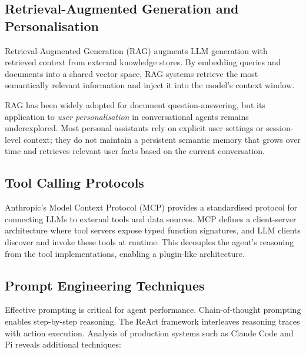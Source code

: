 \subsection{Retrieval-Augmented Generation and Personalisation}

Retrieval-Augmented Generation (RAG) \cite{lewis2020rag} augments LLM generation with retrieved context from external knowledge stores. By embedding queries and documents into a shared vector space, RAG systems retrieve the most semantically relevant information and inject it into the model's context window.

RAG has been widely adopted for document question-answering, but its application to \textit{user personalisation} in conversational agents remains underexplored. Most personal assistants rely on explicit user settings or session-level context; they do not maintain a persistent semantic memory that grows over time and retrieves relevant user facts based on the current conversation.

\subsection{Tool Calling Protocols}

Anthropic's Model Context Protocol (MCP) \cite{anthropic2024mcp} provides a standardised protocol for connecting LLMs to external tools and data sources. MCP defines a client-server architecture where tool servers expose typed function signatures, and LLM clients discover and invoke these tools at runtime. This decouples the agent's reasoning from the tool implementations, enabling a plugin-like architecture.

\subsection{Prompt Engineering Techniques}

Effective prompting is critical for agent performance. Chain-of-thought prompting \cite{wei2022chainofthought} enables step-by-step reasoning. The ReAct framework \cite{yao2023react} interleaves reasoning traces with action execution. Analysis of production systems such as Claude Code \cite{anthropic2025claudecode} and Pi \cite{badlogic2025pi} reveals additional techniques:

